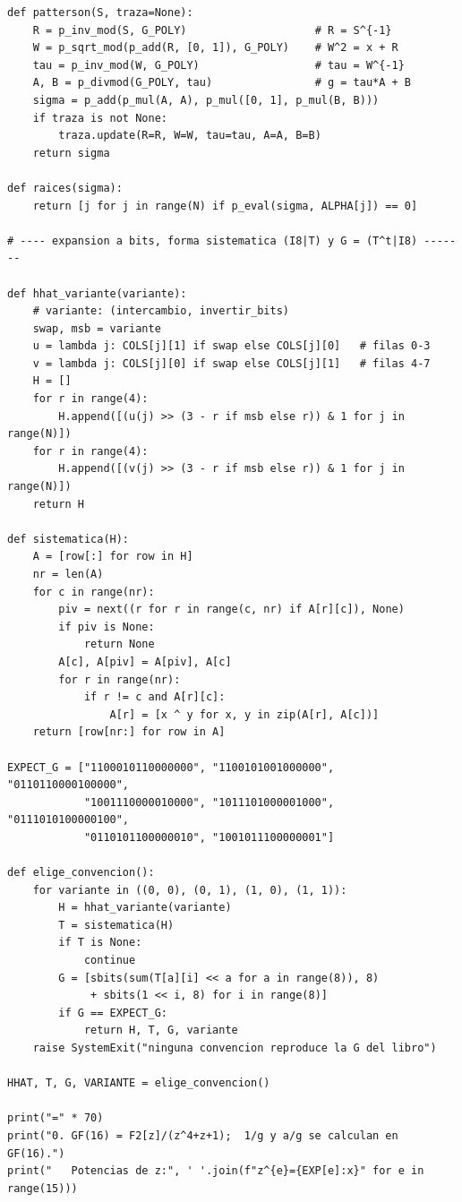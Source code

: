\begin{lstlisting}
def patterson(S, traza=None):
    R = p_inv_mod(S, G_POLY)                    # R = S^{-1}
    W = p_sqrt_mod(p_add(R, [0, 1]), G_POLY)    # W^2 = x + R
    tau = p_inv_mod(W, G_POLY)                  # tau = W^{-1}
    A, B = p_divmod(G_POLY, tau)                # g = tau*A + B
    sigma = p_add(p_mul(A, A), p_mul([0, 1], p_mul(B, B)))
    if traza is not None:
        traza.update(R=R, W=W, tau=tau, A=A, B=B)
    return sigma

def raices(sigma):
    return [j for j in range(N) if p_eval(sigma, ALPHA[j]) == 0]

# ---- expansion a bits, forma sistematica (I8|T) y G = (T^t|I8) -------

def hhat_variante(variante):
    # variante: (intercambio, invertir_bits)
    swap, msb = variante
    u = lambda j: COLS[j][1] if swap else COLS[j][0]   # filas 0-3
    v = lambda j: COLS[j][0] if swap else COLS[j][1]   # filas 4-7
    H = []
    for r in range(4):
        H.append([(u(j) >> (3 - r if msb else r)) & 1 for j in range(N)])
    for r in range(4):
        H.append([(v(j) >> (3 - r if msb else r)) & 1 for j in range(N)])
    return H

def sistematica(H):
    A = [row[:] for row in H]
    nr = len(A)
    for c in range(nr):
        piv = next((r for r in range(c, nr) if A[r][c]), None)
        if piv is None:
            return None
        A[c], A[piv] = A[piv], A[c]
        for r in range(nr):
            if r != c and A[r][c]:
                A[r] = [x ^ y for x, y in zip(A[r], A[c])]
    return [row[nr:] for row in A]

EXPECT_G = ["1100010110000000", "1100101001000000", "0110110000100000",
            "1001110000010000", "1011101000001000", "0111010100000100",
            "0110101100000010", "1001011100000001"]

def elige_convencion():
    for variante in ((0, 0), (0, 1), (1, 0), (1, 1)):
        H = hhat_variante(variante)
        T = sistematica(H)
        if T is None:
            continue
        G = [sbits(sum(T[a][i] << a for a in range(8)), 8)
             + sbits(1 << i, 8) for i in range(8)]
        if G == EXPECT_G:
            return H, T, G, variante
    raise SystemExit("ninguna convencion reproduce la G del libro")

HHAT, T, G, VARIANTE = elige_convencion()

print("=" * 70)
print("0. GF(16) = F2[z]/(z^4+z+1);  1/g y a/g se calculan en GF(16).")
print("   Potencias de z:", ' '.join(f"z^{e}={EXP[e]:x}" for e in range(15)))


\end{lstlisting}
